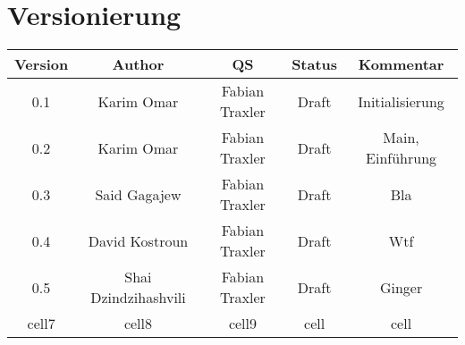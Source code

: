 
\section{Versionierung}
\begin{center}
\begin{tabular}{ |c|c|c|c|c| } 
 \hline
 \textbf{Version} & \textbf{Author} & \textbf{QS} & \textbf{Status} & \textbf{Kommentar} \\ 
 \hline
 0.1 & Karim Omar & Fabian Traxler & Draft & Initialisierung \\ 
 \hline
 0.2 & Karim Omar & Fabian Traxler & Draft & Main, Einführung \\
 \hline
 0.3 & Said Gagajew & Fabian Traxler & Draft & Bla \\
 \hline
 0.4 & David Kostroun & Fabian Traxler & Draft & Wtf \\
 \hline
 0.5 & Shai Dzindzihashvili & Fabian Traxler & Draft & Ginger \\
 \hline
 cell7 & cell8 & cell9 & cell & cell \\ 
 \hline
\end{tabular}
\end{center}

